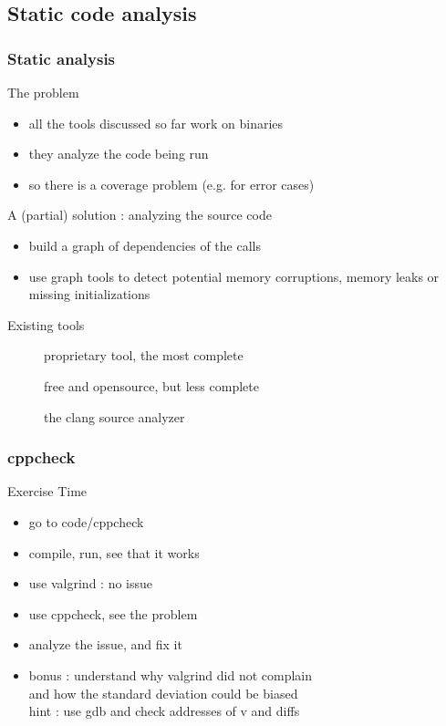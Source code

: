 \subsection[static]{Static code analysis}

\begin{frame}[fragile]
  \frametitle{Static analysis}
  \begin{alertblock}{The problem}
    \begin{itemize}
    \item all the tools discussed so far work on binaries
    \item they analyze the code being run
    \item so there is a coverage problem (e.g. for error cases)
    \end{itemize}
  \end{alertblock}
  \pause
  \begin{block}{A (partial) solution : analyzing the source code}
    \begin{itemize}
    \item build a graph of dependencies of the calls
    \item use graph tools to detect potential memory corruptions,
      memory leaks or missing initializations
    \end{itemize}
  \end{block}
  \pause
  \begin{block}{Existing tools}
    \begin{description}
    \item[\href{http://www.coverity.com/}{}]
      proprietary tool, the most complete
    \item[\href{http://cppcheck.sourceforge.net/}{}]
      free and opensource, but less complete
    \item[\href{http://clang-analyzer.llvm.org/}{}]
      the clang source analyzer
    \end{description}
  \end{block}
\end{frame}

\begin{frame}[fragile]
  \frametitle{cppcheck}
  \begin{alertblock}{Exercise Time}
    \begin{itemize}
    \item go to code/cppcheck
    \item compile, run, see that it works
    \item use valgrind : no issue
    \item use cppcheck, see the problem
    \item analyze the issue, and fix it
    \item bonus : understand why valgrind did not complain \\
      and how the standard deviation could be biased \\
      hint : use gdb and check addresses of v and diffs
    \end{itemize}
  \end{alertblock}
\end{frame}
